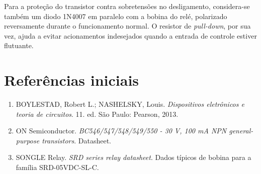 \documentclass[12pt,a4paper]{article}
\begin{document}
Para a proteção do transistor contra sobretensões no desligamento, considera-se também um diodo 1N4007 em paralelo com a bobina do relé, polarizado reversamente durante o funcionamento normal. O resistor de \emph{pull-down}, por sua vez, ajuda a evitar acionamentos indesejados quando a entrada de controle estiver flutuante.

\section*{Referências iniciais}

\begin{enumerate}[leftmargin=1.0cm]
    \item BOYLESTAD, Robert L.; NASHELSKY, Louis. \textit{Dispositivos eletrônicos e teoria de circuitos}. 11. ed. São Paulo: Pearson, 2013.
    \item ON Semiconductor. \textit{BC546/547/548/549/550 - 30 V, 100 mA NPN general-purpose transistors}. Datasheet.
    \item SONGLE Relay. \textit{SRD series relay datasheet}. Dados típicos de bobina para a família SRD-05VDC-SL-C.
\end{enumerate}
\end{document}
